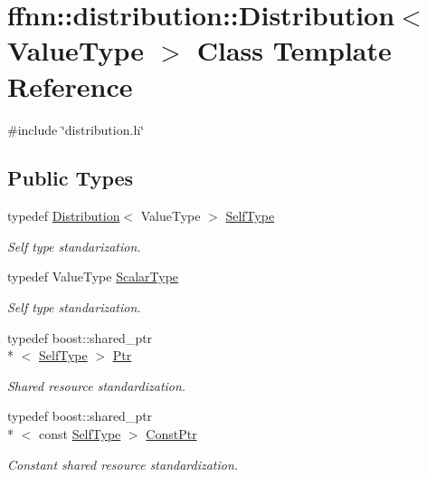 \hypertarget{classffnn_1_1distribution_1_1_distribution}{\section{ffnn\-:\-:distribution\-:\-:Distribution$<$ Value\-Type $>$ Class Template Reference}
\label{classffnn_1_1distribution_1_1_distribution}
}


{\ttfamily \#include \char`\"{}distribution.\-h\char`\"{}}

\subsection*{Public Types}
\begin{DoxyCompactItemize}
\item 
typedef \hyperlink{classffnn_1_1distribution_1_1_distribution}{Distribution}$<$ Value\-Type $>$ \hyperlink{classffnn_1_1distribution_1_1_distribution_ae1a3da8f16a034d6c051fcfdcf69f0d2}{Self\-Type}
\begin{DoxyCompactList}\small\item\em Self type standarization. \end{DoxyCompactList}\item 
typedef Value\-Type \hyperlink{classffnn_1_1distribution_1_1_distribution_ad62797f0dcb4bb4698bdf17e3f3b07bb}{Scalar\-Type}
\begin{DoxyCompactList}\small\item\em Self type standarization. \end{DoxyCompactList}\item 
typedef boost\-::shared\-\_\-ptr\\*
$<$ \hyperlink{classffnn_1_1distribution_1_1_distribution_ae1a3da8f16a034d6c051fcfdcf69f0d2}{Self\-Type} $>$ \hyperlink{classffnn_1_1distribution_1_1_distribution_a51d4ea875b70b07862c5f68b20c8f41a}{Ptr}
\begin{DoxyCompactList}\small\item\em Shared resource standardization. \end{DoxyCompactList}\item 
typedef boost\-::shared\-\_\-ptr\\*
$<$ const \hyperlink{classffnn_1_1distribution_1_1_distribution_ae1a3da8f16a034d6c051fcfdcf69f0d2}{Self\-Type} $>$ \hyperlink{classffnn_1_1distribution_1_1_distribution_a829c8056b31313f6196f5659ca9503cc}{Const\-Ptr}
\begin{DoxyCompactList}\small\item\em Constant shared resource standardization. \end{DoxyCompactList}\end{DoxyCompactItemize}

